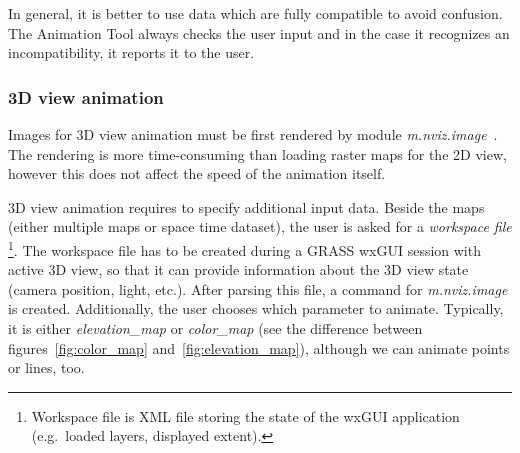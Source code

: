 \documentclass[a4paper,12pt,oneside]{book}
\newcommand{\module}[1]{\textsl{#1}}
\newcommand{\at}{Animation Tool\xspace}
\begin{document}
In general, it is better to use data which are fully compatible to avoid confusion.
The \at always checks the user input and in the case it recognizes an incompatibility, it reports it to the user.


\subsubsection{3D view animation}
\label{sec:3dViewAnimation}
Images for 3D view animation must be first rendered by module \module{m.nviz.image}~\cite{grassUserMan}.
The rendering is more time-consuming than loading raster maps for the 2D view,
however this does not affect the speed of the animation itself.

3D view animation requires to specify additional input data.
Beside the maps (either multiple maps or space time dataset), the user is asked for a \emph{workspace file}%
\footnote{Workspace file is XML file storing the state of the wxGUI application (e.g.\ loaded layers, displayed extent).}.
The workspace file has to be created during a GRASS wxGUI session with active 3D view,
so that it can provide information about the 3D view state (camera position, light, etc.).
After parsing this file, a command for \module{m.nviz.image}
is created.
Additionally, the user chooses which parameter to animate.
Typically, it is either \emph{elevation\_map} or \emph{color\_map}
(see the difference between figures~\ref{fig:color_map} and~\ref{fig:elevation_map}),
although we can animate points or lines, too.
\end{document}
